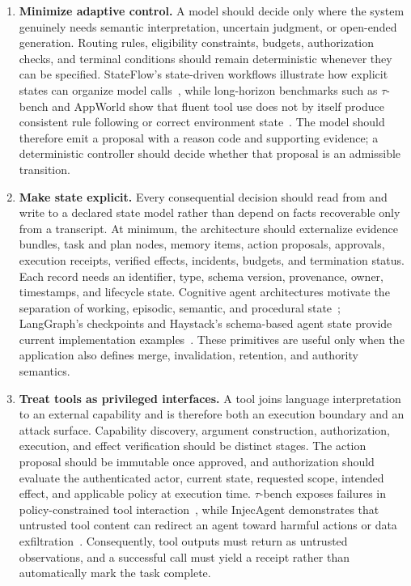 \begin{enumerate}
    \item \textbf{Minimize adaptive control.} A model should decide only where the system genuinely needs semantic interpretation, uncertain judgment, or open-ended generation. Routing rules, eligibility constraints, budgets, authorization checks, and terminal conditions should remain deterministic whenever they can be specified. StateFlow's state-driven workflows illustrate how explicit states can organize model calls~\cite{wu2024stateflow}, while long-horizon benchmarks such as $\tau$-bench and AppWorld show that fluent tool use does not by itself produce consistent rule following or correct environment state~\cite{yao2024taubench,trivedi2024appworld}. The model should therefore emit a proposal with a reason code and supporting evidence; a deterministic controller should decide whether that proposal is an admissible transition.

    \item \textbf{Make state explicit.} Every consequential decision should read from and write to a declared state model rather than depend on facts recoverable only from a transcript. At minimum, the architecture should externalize evidence bundles, task and plan nodes, memory items, action proposals, approvals, execution receipts, verified effects, incidents, budgets, and termination status. Each record needs an identifier, type, schema version, provenance, owner, timestamps, and lifecycle state. Cognitive agent architectures motivate the separation of working, episodic, semantic, and procedural state~\cite{sumers2024coala}; LangGraph's checkpoints and Haystack's schema-based agent state provide current implementation examples~\cite{langgraph2026persistence,deepset2026haystackstate}. These primitives are useful only when the application also defines merge, invalidation, retention, and authority semantics.

    \item \textbf{Treat tools as privileged interfaces.} A tool joins language interpretation to an external capability and is therefore both an execution boundary and an attack surface. Capability discovery, argument construction, authorization, execution, and effect verification should be distinct stages. The action proposal should be immutable once approved, and authorization should evaluate the authenticated actor, current state, requested scope, intended effect, and applicable policy at execution time. $\tau$-bench exposes failures in policy-constrained tool interaction~\cite{yao2024taubench}, while InjecAgent demonstrates that untrusted tool content can redirect an agent toward harmful actions or data exfiltration~\cite{zhan2024injecagent}. Consequently, tool outputs must return as untrusted observations, and a successful call must yield a receipt rather than automatically mark the task complete.


\end{enumerate}
